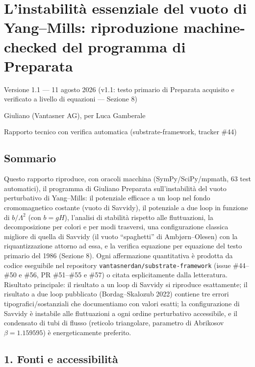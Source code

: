 \documentclass[
]{article}
\author{}
\date{}
\begin{document}
\hypertarget{linstabilituxe0-essenziale-del-vuoto-di-yangmills-riproduzione-machine-checked-del-programma-di-preparata}{%
\section{L'instabilità essenziale del vuoto di Yang--Mills: riproduzione
machine-checked del programma di
Preparata}\label{linstabilituxe0-essenziale-del-vuoto-di-yangmills-riproduzione-machine-checked-del-programma-di-preparata}}

Versione 1.1 --- 11 agosto 2026 (v1.1: testo primario di Preparata
acquisito e verificato a livello di equazioni --- Sezione 8)

Giuliano (Vantasner AG), per Luca Gamberale

Rapporto tecnico con verifica automatica (substrate-framework, tracker
\#44)

\hypertarget{sommario}{%
\subsection{Sommario}\label{sommario}}

Questo rapporto riproduce, con oracoli macchina (SymPy/SciPy/mpmath, 63
test automatici), il programma di Giuliano Preparata sull'instabilità
del vuoto perturbativo di Yang--Mills: il potenziale efficace a un loop
nel fondo cromomagnetico costante (vuoto di Savvidy), il potenziale a
due loop in funzione di \(b/\Lambda^2\) (con \(b = gH\)), l'analisi di
stabilità rispetto alle fluttuazioni, la decomposizione per colori e per
modi trasversi, una configurazione classica migliore di quella di
Savvidy (il vuoto ``spaghetti'' di Ambjørn--Olesen) con la
riquantizzazione attorno ad essa, e la verifica equazione per equazione
del testo primario del 1986 (Sezione 8). Ogni affermazione quantitativa
è prodotta da codice eseguibile nel repository
\texttt{vantasnerdan/substrate-framework} (issue \#44--\#50 e \#56, PR
\#51--\#55 e \#57) o citata esplicitamente dalla letteratura. Risultato
principale: il risultato a un loop di Savvidy si riproduce esattamente;
il risultato a due loop pubblicato (Bordag--Skalozub 2022) contiene tre
errori tipografici/sostanziali che documentiamo con valori esatti; la
configurazione di Savvidy è instabile alle fluttuazioni a ogni ordine
perturbativo accessibile, e il condensato di tubi di flusso (reticolo
triangolare, parametro di Abrikosov \(\beta = 1.159595\)) è
energeticamente preferito.

\hypertarget{fonti-e-accessibilituxe0}{%
\subsection{1. Fonti e accessibilità}\label{fonti-e-accessibilituxe0}}
\end{document}
